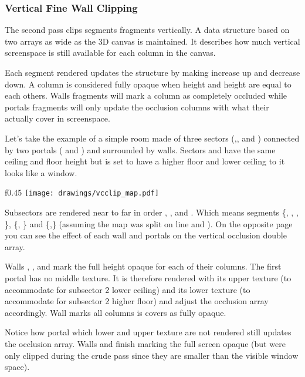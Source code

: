 \subsubsection{Vertical Fine Wall Clipping}
The second pass clips segments fragments vertically. A data structure based on two arrays as wide as the 3D canvas is maintained. It describes how much vertical screenspace is still available for each column in the canvas.\\
\par
 Each segment rendered updates the structure by making  increase up  and  decrease down. A column is considered fully opaque when  height and  height are equal to each others. Walls fragments will mark a column as completely occluded while portals fragments will only update the occlusion columns with what their actually cover in screenspace.\\
\par
{}
\par
Let's take the example of a simple room made of three sectors (,, and ) connected by two portals ( and ) and surrounded by walls. Sectors  and  have the same ceiling and floor height but  is set to have a higher floor and lower ceiling to it looks like a window.\\
\par

\begin{wrapfigure}[16]{f}{0.45\textwidth}
\centering
\texttt{[image: drawings/vcclip\_map.pdf]}
\end{wrapfigure}


Subsectors are rendered near to far in order , , and . Which means segments \{, , , \}, \{, \} and \{,\} (assuming the map was split on line  and ). On the opposite page you can see the effect of each wall and portals on the vertical occlusion double array.\\
\par
Walls , , and  mark the full height opaque for each of their columns. The first portal  has no middle texture. It is therefore rendered with its upper texture (to accommodate for subsector 2 lower ceiling) and its lower texture (to accommodate for subsector 2 higher floor) and adjust the occlusion array accordingly. Wall  marks all columns is covers as fully opaque.\\
\par
Notice how portal  which lower and upper texture are not rendered still updates the occlusion array. Walls  and  finish marking the full screen opaque (but were only clipped during the crude pass since they are smaller than the visible window space).


